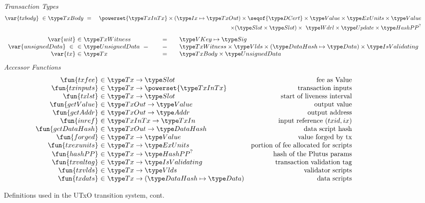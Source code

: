 \begin{figure*}[htb]
  \emph{Transaction Types}
  \begin{align*}
    \var{txbody} ~\in~
    & \TxBody ~=~
    & \powerset{\TxInTx} \times (\Ix \mapsto \TxOut) \times \seqof{\DCert}
      \times \Value \times \ExUnits \times \Value \\
    & ~& \times (\Slot\times\Slot) \times~ \Wdrl \times \Update \times \HashPP^?
  \end{align*}
  \begin{equation*}
    \begin{array}{r@{~\in~}l@{\qquad=\qquad}l}
      \var{wit} & \TxWitness & \VKey \mapsto \Sig
      \\
      \var{unsignedData} ~\in~
      & \UnsignedData ~=~
      & \TxWitness \times \Vlds \times (\HashDat \mapsto \Data)
            \times \IsValidating
      \\
      \var{tx}
      & \Tx
      & \TxBody \times \UnsignedData
    \end{array}
  \end{equation*}
  \emph{Accessor Functions}
  \begin{equation*}
    \begin{array}{r@{~\in~}lr}
      \fun{txfee} & \Tx \to \Slot & \text{fee as Value} \\
      \fun{txinputs} & \Tx \to \powerset{\TxInTx} & \text{transaction inputs} \\
      \fun{txlst} & \Tx \to \Slot & \text{start of liveness interval} \\
      \fun{getValue} & \TxOut \to \Value & \text{output value} \\
      \fun{getAddr} & \TxOut \to \Addr & \text{output address} \\
      \fun{inref} & \TxInTx \to \TxIn & \text{input reference $(txid,ix)$} \\
      \fun{getDataHash} & \TxOut \to \HashDat & \text{data script hash} \\
      \fun{forged} & \Tx \to \Value & \text{value forged by tx}\\
      \fun{txexunits} & \Tx \to \ExUnits & \text{portion of fee allocated for scripts}\\
      \fun{hashPP} & \Tx \to \HashPP^? & \text{hash of the Plutus params}\\
      \fun{txvaltag} & \Tx \to \IsValidating & \text{transaction validation tag}\\
      \fun{txvlds} & \Tx \to \Vlds & \text{validator scripts}\\
      \fun{txdats} & \Tx \to (\HashDat \mapsto \Data) & \text{data scripts}\\
    \end{array}
  \end{equation*}
  \caption{Definitions used in the UTxO transition system, cont.}
  \label{fig:defs:utxo-shelley-2}
\end{figure*}


